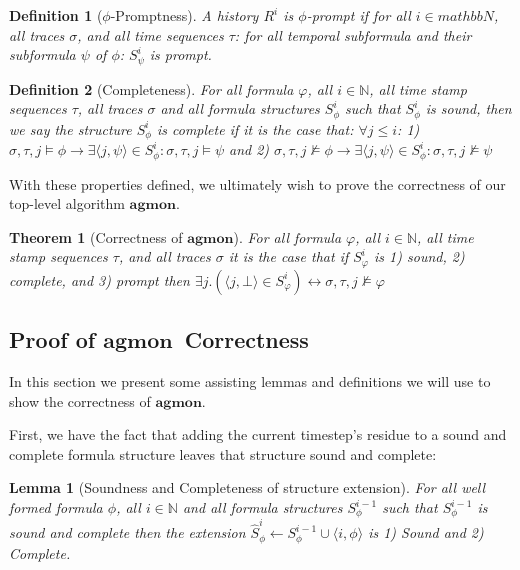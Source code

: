 \documentclass[10pt,a4paper]{article}
\newcommand{\rp}[2]{\ensuremath{\langle #1, #2 \rangle}}
\newcommand{\agmon}{\ensuremath{\mathbf{agmon}}}
\newtheorem{thm}{Theorem}
\newtheorem{tdef}{Definition}
\newtheorem{lemma}{Lemma}
\begin{document}
\begin{tdef}[$\phi$-Promptness]
A history $R^i$ is $\phi$-prompt if for all $i \in mathbb{N}$, all traces $\sigma$, and all time sequences $\tau$: for all temporal subformula and their subformula $\psi$ of $\phi$: $S^i_{\psi}$ is prompt.
\end{tdef}

\begin{tdef}[Completeness] For all formula $\varphi$, all $i \in \mathbb{N}$, all time stamp sequences $\tau$, all traces $\sigma$ and all formula structures $S^i_{\phi}$ such that $S^i_{\phi}$ is sound, then we say the structure $S^i_{\phi}$ is complete if it is the case that: 
$\forall j \leq i$:
1) $\sigma, \tau, j \vDash \phi \rightarrow \exists\rp{j}{\psi} \in S^i_{\phi}: \sigma, \tau, j \vDash \psi$ 
and 
2) $\sigma, \tau, j \nvDash \phi \rightarrow \exists\rp{j}{\psi} \in S^i_{\phi}: \sigma, \tau, j \nvDash \psi$

\end{tdef}

With these properties defined, we ultimately wish to prove the correctness of our top-level algorithm \agmon.

\begin{thm}[Correctness of \agmon]
For all formula $\varphi$, all $i \in \mathbb{N}$, all time stamp sequences $\tau$, and all traces $\sigma$ it is the case that if $S^i_{\varphi}$ is 1) sound, 2) complete, and 3) prompt then $\exists j.(\rp{j}{\bot} \in S^i_{\varphi}) \leftrightarrow \sigma, \tau, j \nvDash \varphi$
\end{thm}

\subsection{Proof of \agmon\ Correctness}
In this section we present some assisting lemmas and definitions we will use to show the correctness of \agmon.


First, we have the fact that adding the current timestep's residue to a sound and complete formula structure leaves that structure sound and complete:

\begin{lemma}[Soundness and Completeness of structure extension]
For all well formed formula $\phi$, all $i \in \mathbb{N}$ and all formula structures $S^{i-1}_{\phi}$ such that $S^{i-1}_{\phi}$ is sound and complete then the extension $\hat{S}^{i}_{\phi} \leftarrow S^{i-1}_{\phi} \cup \rp{i}{\phi}$ is 1) Sound and 2) Complete.
\end{lemma}
\end{document}
